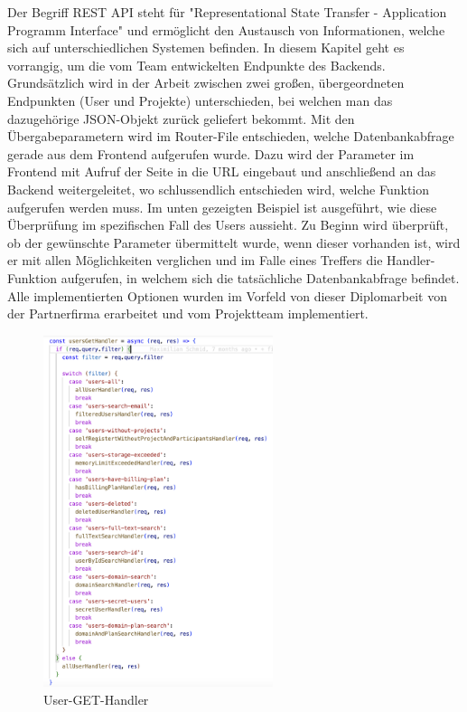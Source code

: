 Der Begriff REST API steht für "Representational State Transfer - Application Programm Interface" und ermöglicht den Austausch von Informationen, welche sich auf unterschiedlichen Systemen befinden. In diesem Kapitel geht es vorrangig, um die vom Team entwickelten Endpunkte des Backends. Grundsätzlich wird in der Arbeit zwischen zwei großen, übergeordneten Endpunkten (User und Projekte) unterschieden, bei welchen man das dazugehörige JSON-Objekt zurück geliefert bekommt. Mit den Übergabeparametern wird im Router-File entschieden, welche Datenbankabfrage gerade aus dem Frontend aufgerufen wurde. Dazu wird der Parameter im Frontend mit Aufruf der Seite in die URL eingebaut und anschließend an das Backend weitergeleitet, wo schlussendlich entschieden wird, welche Funktion aufgerufen werden muss.
\newline
Im unten gezeigten Beispiel ist ausgeführt, wie diese Überprüfung im spezifischen Fall des Users aussieht. Zu Beginn wird überprüft, ob der gewünschte Parameter übermittelt wurde, wenn dieser vorhanden ist, wird er mit allen Möglichkeiten verglichen und im Falle eines Treffers die Handler-Funktion aufgerufen, in welchem sich die tatsächliche Datenbankabfrage befindet. Alle implementierten Optionen wurden im Vorfeld von dieser Diplomarbeit von der Partnerfirma erarbeitet und vom Projektteam implementiert.
\newline
\begin{figure}[h!]
    \centering
    \includegraphics[width=0.6\textwidth]{pics/REST_API_Img.png}
    \caption{User-GET-Handler}
    \label{fig:enter-label}
\end{figure}